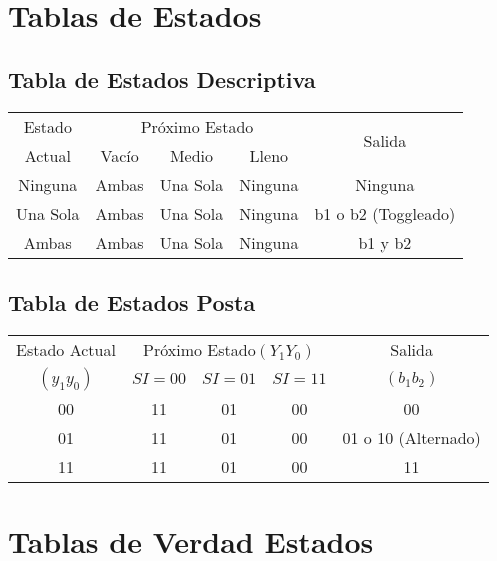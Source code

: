 \documentclass[10pt,a4paper]{article}
\begin{document}
\section*{Tablas de Estados}
\subsection*{Tabla de Estados Descriptiva}

\begin{table}[ht]
	\centering
	\begin{tabular}{c|ccc|c}
	Estado & \multicolumn{3}{c|}{Próximo Estado} & \multirow{2}{*}{Salida}\\
	\cline{2-4}
	Actual & Vacío & Medio & Lleno \\
	\hline
	Ninguna 	& Ambas & Una Sola & Ninguna & Ninguna \\
	Una Sola 	& Ambas & Una Sola & Ninguna & b1 o b2 (Toggleado) \\
	Ambas 		& Ambas & Una Sola & Ninguna & b1 y b2 \\
	\end{tabular}
\end{table}

\subsection*{Tabla de Estados Posta}

\begin{table}[ht]
	\centering
	\begin{tabular}{c|c|c|c|c}
	Estado Actual & \multicolumn{3}{c|}{Próximo Estado$(Y_1Y_0)$} & Salida\\
	\cline{2-4}
	$(y_1y_0)$ & $SI=00$ & $SI=01$ & $SI=11$ & $(b_1b_2)$\\
	\hline
	00 & 11 & 01 & 00 & 00 \\
	01 & 11 & 01 & 00 & 01 o 10 (Alternado) \\
	11 & 11 & 01 & 00 & 11 \\
	\end{tabular}
\end{table}

\section*{Tablas de Verdad Estados}
\end{document}
